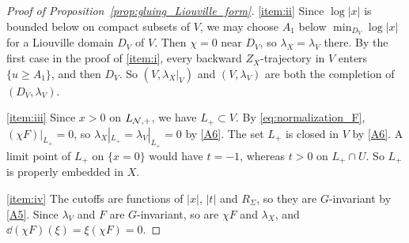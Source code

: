 \documentclass[12pt, letter]{amsart}
\theoremstyle{definition}
\begin{document}
\begin{proof}[Proof of Proposition~\ref{prop:gluing_Liouville_form}]
\ref{item:ii} Since $\log|x|$ is bounded below on compact subsets of $V$, we may choose $A_1$ below $\min_{D_V}\log|x|$ for a Liouville domain $D_V$ of $V$.
Then $\chi=0$ near $D_V$, so $\lambda_X=\lambda_V$ there.
By the first case in the proof of \ref{item:i}, every backward $Z_X$-trajectory in $V$ enters $\{u\ge A_1\}$, and then $D_V$.
So $(V,\lambda_X|_V)$ and $(V,\lambda_V)$ are both the completion of $(D_V,\lambda_V)$.


\ref{item:iii} Since $x>0$ on $L_{\mathcal{N}, +}$, we have $L_+\subset V$.
By \eqref{eq:normalization_F}, $(\chi F)|_{L_+}=0$, so $\lambda_X|_{L_+}=\lambda_V|_{L_+}=0$ by \ref{A6}.
The set $L_+$ is closed in $V$ by \ref{A6}.
A limit point of $L_+$ on $\{x=0\}$ would have $t=-1$, whereas $t>0$ on $L_+\cap U$.
So $L_+$ is properly embedded in $X$.

\ref{item:iv} The cutoffs are functions of $|x|$, $|t|$ and $R_\Sigma$, so they are $G$-invariant by \ref{A5}.
Since $\lambda_V$ and $F$ are $G$-invariant, so are $\chi F$ and $\lambda_X$, and $\dd(\chi F)(\xi)=\xi(\chi F)=0$.



\end{proof}
\end{document}
